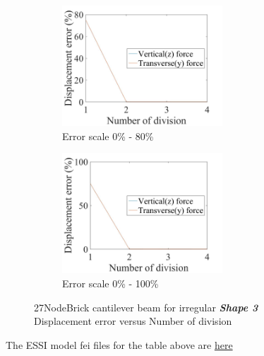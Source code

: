 \documentclass[fleqn,11pt]{article}
\begin{document}
\begin{figure}[H]
  \begin{subfigure}{0.5\textwidth}
    \centering
    \includegraphics[width=6cm]{../Figure-files/error27brick_beam_irregular_shape3.jpeg}
    \caption{Error scale 0\% - 80\%}
  \end{subfigure}
  \begin{subfigure}{0.5\textwidth}
    \centering
    \includegraphics[width=6cm]{../Figure-files/error27brick_beam_irregular_shape3100.jpeg}
    \caption{Error scale 0\% - 100\%}
  \end{subfigure}
  \captionsetup{justification=centering,margin=3cm}
  \caption{27NodeBrick cantilever beam for irregular \textbf{\emph{Shape 3}}\\
      Displacement error   versus   Number of division}
  \label{fig shape 3 27NodeBrick cantilever beam for irregular more elements}
\end{figure}



The ESSI model fei files for the table above are \href{https://github.com/yuan-energy/ESSI_Verification/blob/master/27NodeBrick/cantilever_irregular_element_cut/cantilever_irregular_element_cut.tar.gz?raw=true}{here}












\end{document}

